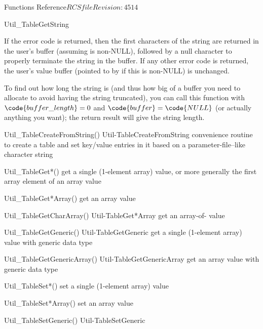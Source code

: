 \begin{cactuspart}{ Functions Reference}{$RCSfile$}{$Revision: 4514 $}
\begin{FunctionDescription}{Util\_TableGetString}
\begin{Discussion}
If the error code  is returned,
then the first  characters of the string are
returned in the user's buffer (assuming  is non-NULL),
followed by a null character to properly terminate the string in the
buffer.  If any other error code is returned, the user's value buffer
(pointed to by  if this is non-NULL) is unchanged.

To find out how long the string is (and thus how big of a buffer you
need to allocate to avoid having the string truncated), you can call
this function with $\code{buffer\_length} = 0$ and $\code{buffer} = \code{NULL}$
(or actually anything you want); the return result will give the
string length.
\end{Discussion}

\begin{SeeAlsoSection}
\begin{SeeAlso2} {Util\_TableCreateFromString()} {Util-TableCreateFromString}
convenience routine to create a table and set key/value entries
in it based on a parameter-file--like character string
\end{SeeAlso2}
\begin{SeeAlso}{Util\_TableGet*()}
get a single (1-element array) value,
or more generally the first array element of an array value
\end{SeeAlso}
\begin{SeeAlso}{Util\_TableGet*Array()}
get an array value
\end{SeeAlso}
\begin{SeeAlso2} {Util\_TableGetCharArray()} {Util-TableGet*Array}
get an array-of- value
\end{SeeAlso2}
\begin{SeeAlso2} {Util\_TableGetGeneric()} {Util-TableGetGeneric}
get a single (1-element array) value with generic data type
\end{SeeAlso2}
\begin{SeeAlso2} {Util\_TableGetGenericArray()} {Util-TableGetGenericArray}
get an array value with generic data type
\end{SeeAlso2}
\begin{SeeAlso}{Util\_TableSet*()}
set a single (1-element array) value
\end{SeeAlso}
\begin{SeeAlso}{Util\_TableSet*Array()}
set an array value
\end{SeeAlso}
\begin{SeeAlso2} {Util\_TableSetGeneric()} {Util-TableSetGeneric}

\end{SeeAlso2}
\end{SeeAlsoSection}
\end{FunctionDescription}
\end{cactuspart}
